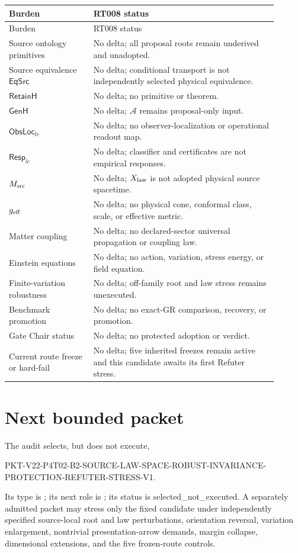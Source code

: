 \documentclass[11pt]{article}
\newcommand{\status}[1]{\textsf{#1}}
\begin{document}
\begin{longtable}{P{0.29\linewidth}P{0.61\linewidth}}
\toprule
Burden & RT008 status \\
\midrule
\endfirsthead
\toprule
Burden & RT008 status \\
\midrule
\endhead
Source ontology primitives & No delta; all proposal roots remain underived and unadopted. \\
Source equivalence \(\mathsf{EqSrc}\) & No delta; conditional transport is not independently selected physical equivalence. \\
\(\mathsf{RetainH}\) & No delta; no primitive or theorem. \\
\(\mathsf{GenH}\) & No delta; \(\mathcal A\) remains proposal-only input. \\
\(\mathsf{ObsLoc}_{lc}\) & No delta; no observer-localization or operational readout map. \\
\(\mathsf{Resp}_{lc}\) & No delta; classifier and certificates are not empirical responses. \\
\(M_{\rm src}\) & No delta; \(X_{\rm law}\) is not adopted physical source spacetime. \\
\(g_{\rm eff}\) & No delta; no physical cone, conformal class, scale, or effective metric. \\
Matter coupling & No delta; no declared-sector universal propagation or coupling law. \\
Einstein equations & No delta; no action, variation, stress energy, or field equation. \\
Finite-variation robustness & No delta; off-family root and law stress remains unexecuted. \\
Benchmark promotion & No delta; no exact-GR comparison, recovery, or promotion. \\
Gate Chair status & No delta; no protected adoption or verdict. \\
Current route freeze or hard-fail & No delta; five inherited freezes remain active and this candidate awaits its first Refuter stress. \\
\bottomrule
\end{longtable}

\section{Next bounded packet}

The audit selects, but does not execute,
\begin{flushleft}
\small\ttfamily
PKT-V22-P4T02-B2-SOURCE-LAW-SPACE-ROBUST-INVARIANCE-\\
PROTECTION-REFUTER-STRESS-V1.
\end{flushleft}
Its type is ; its next role is
; its status is
\status{selected\_not\_executed}.  A separately admitted packet may stress
only the fixed candidate under independently specified source-local root and
law perturbations, orientation reversal, variation enlargement, nontrivial
presentation-arrow demands, margin collapse, dimensional extensions, and the
five frozen-route controls.
\end{document}
